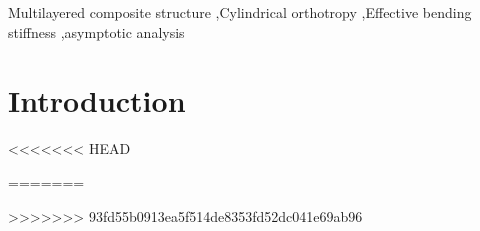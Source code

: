 \documentclass[preprint,10pt,times]{elsarticle}
\numberwithin{equation}{section}
\renewcommand{\>}{$\Rightarrow$}
\begin{document}
\begin{frontmatter}
\begin{abstract}
\end{abstract}

\begin{keyword}
Multilayered composite structure \sep Cylindrical orthotropy \sep Effective bending stiffness \sep asymptotic analysis



\end{keyword}

\end{frontmatter}

\linenumbers

\section{Introduction}
\label{sec:intro}
<<<<<<< HEAD



=======


>>>>>>> 93fd55b0913ea5f514de8353fd52dc041e69ab96

\end{document}
